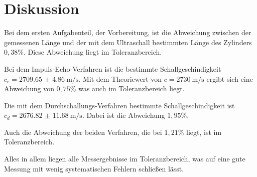\section{Diskussion}

Bei dem ersten Aufgabenteil, der Vorbereitung, ist die Abweichung zwischen der gemessenen
Länge und der mit dem Ultraschall bestimmten Länge des Zylinders $0,38 \%$.
Diese Abweichung liegt im Toleranzbereich.

Bei dem Impuls-Echo-Verfahren ist die bestimmte Schallgeschindigkeit \\
$c_e = \SI{2709.65(486)}{\meter\per\second}$.
Mit dem Theoriewert von $c = \SI{2730}{\meter\per\second}$ ergibt sich eine Abweichung von
$0,75 \%$ was auch im Toleranzbereich liegt.

Die mit dem Durchschallungs-Verfahren bestimmte Schallgeschindigkeit ist\\
$c_d = \SI{2676.82(1168)}{\meter\per\second}$.
Dabei ist die Abweichung $1,95 \%$.

Auch die Abweichung der beiden Verfahren, die bei $1,21 \%$ liegt, ist im Toleranzbereich.

Alles in allem liegen alle Messergebnisse im Toleranzbereich, was auf eine gute
Messung mit wenig systematischen Fehlern schließen lässt.
